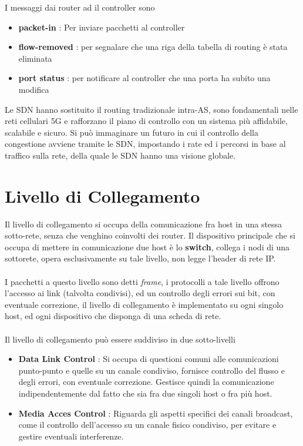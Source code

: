\documentclass[12pt, letterpaper]{article}
\newcommand{\acc}{\\\hphantom{}\\}
\begin{document}
I messaggi dai router ad il controller sono\begin{itemize}
    \item \textbf{packet-in} : Per inviare pacchetti al controller 
    \item \textbf{flow-removed} : per segnalare che una riga della tabella di routing è stata eliminata 
    \item \textbf{port status} : per notificare al controller che una porta ha subito una modifica 
\end{itemize}
Le SDN hanno sostituito il routing tradizionale intra-AS, sono fondamentali nelle reti cellulari 5G e rafforzano il 
piano di controllo con un sistema più affidabile, scalabile e sicuro. Si può immaginare un futuro in cui il controllo 
della congestione avviene tramite le SDN, impostando i rate ed i percorsi in base al traffico sulla rete, della quale 
le SDN hanno una visione globale.
\section{Livello di Collegamento}
Il livello di collegamento si occupa della comunicazione fra host in una stessa sotto-rete, senza che venghino 
coinvolti dei router. Il dispositivo principale che si occupa di mettere in comunicazione due host 
è lo \textbf{switch}, collega i nodi di una sottorete, opera esclusivamente su tale livello, non legge 
l'header di rete IP.\acc 
I pacchetti a questo livello sono detti \textit{frame}, i protocolli a tale livello offrono l'accesso ai 
link (talvolta condivisi), ed un controllo degli errori sui bit, con eventuale correzione, il livello di collegamento è 
implementato su ogni singolo host, ed ogni dispositivo che disponga di una scheda di rete.\acc 
Il livello di collegamento può essere suddiviso in due sotto-livelli\begin{itemize}
    \item \textbf{Data Link Control} : Si occupa di questioni comuni alle comunicazioni punto-punto e quelle 
    su un canale condiviso, fornisce controllo del flusso e degli errori, con eventuale correzione. Gestisce quindi 
    la comunicazione indipendentemente dal fatto che sia fra due singoli host o fra più host. 
    \item \textbf{Media Acces Control} : Riguarda gli aspetti specifici dei canali broadcast, come il controllo 
    dell'accesso su un canale fisico condiviso, per evitare e gestire eventuali interferenze.
\end{itemize}
\end{document}
